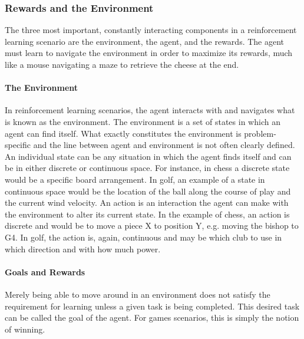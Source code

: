 \subsubsection*{Rewards and the Environment}


The three most important, constantly interacting components in a reinforcement
learning scenario are
the environment, the agent, and the rewards.
%
The agent must learn to navigate the environment in order to maximize its
rewards,
much like a mouse navigating a maze to retrieve the cheese at the end.

\paragraph*{The Environment}

In reinforcement learning scenarios,
the agent interacts with and navigates what is known as the environment.
%
The environment is a set of states in which an agent can find itself.
%
What exactly constitutes the environment is problem-specific
and the line between agent and environment is not often clearly defined.
%
An individual state can be any situation in which the agent finds itself
and can be in either discrete or continuous space.
%
For instance, in chess a discrete state would be a specific board arrangement.
%
In golf, an example of a state in continuous space would be 
the location of the ball along the course of play
and the current wind velocity.
%
An action is an interaction the agent can make with the environment to alter
its current state.
%
In the example of chess,
an action is discrete and would be to move a piece X to position Y,
e.g. moving the bishop to G4.
%
In golf, the action is, again, continuous and may be
which club to use in which direction and with how much power.

\paragraph*{Goals and Rewards}

Merely being able to move around in an environment does not satisfy the
requirement for learning unless a given task is being completed.
%
This desired task can be called the goal of the agent.
%
For games scenarios,
this is simply the notion of winning.

